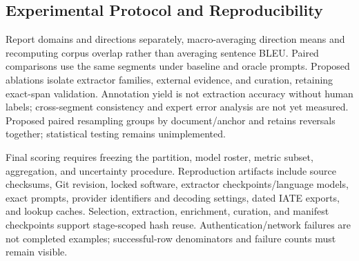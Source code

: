 \subsection{Experimental Protocol and Reproducibility}
\label{sec:protocol}

Report domains and directions separately, macro-averaging direction means and recomputing corpus
overlap rather than averaging sentence BLEU. Paired comparisons use the same segments under baseline
and oracle prompts. Proposed ablations isolate extractor families, external evidence, and curation,
retaining exact-span validation. Annotation yield is not extraction accuracy without human labels;
cross-segment consistency and expert error analysis are not yet measured. Proposed paired resampling
groups by document/anchor and retains reversals together; statistical testing remains unimplemented.

Final scoring requires freezing the partition, model roster, metric subset, aggregation, and
uncertainty procedure. Reproduction artifacts include source checksums, Git revision, locked software,
extractor checkpoints/language models, exact prompts, provider identifiers and decoding settings,
dated IATE exports, and lookup caches. Selection, extraction, enrichment, curation, and manifest
checkpoints support stage-scoped hash reuse. Authentication/network failures are not completed
examples; successful-row denominators and failure counts must remain visible.